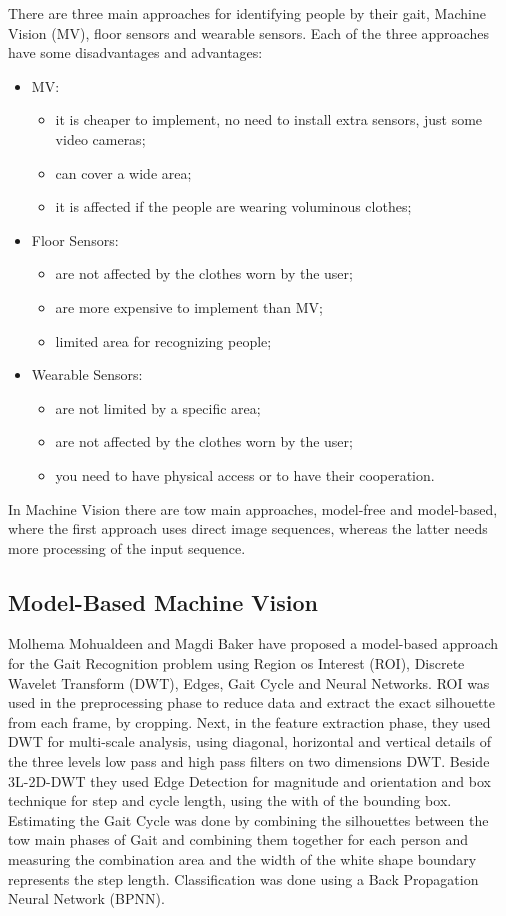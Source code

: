 \documentclass[12pt]{article}
\theoremstyle{definition}
\begin{document}
	There are three main approaches for identifying people by their gait, Machine Vision (MV), floor sensors and wearable sensors. Each of the three approaches have some disadvantages and advantages:
		\begin{itemize}
			\item MV:
				\begin{itemize}
					\item it is cheaper to implement, no need to install extra sensors, just some video cameras;
					\item can cover a wide area;
					\item it is affected if the people are wearing voluminous clothes;
				\end{itemize}
			\item Floor Sensors:
				\begin{itemize}
					\item are not affected by the clothes worn by the user;
					\item are more expensive to implement than MV;
					\item limited area for recognizing people;
				\end{itemize}
			\item Wearable Sensors:
				\begin{itemize}
					\item are not limited by a specific area;
					\item are not affected by the clothes worn by the user;
					\item you need to have physical access or to have their cooperation.
				\end{itemize}
		\end{itemize}

	In Machine Vision there are tow main approaches, model-free and model-based, where the first approach uses direct image sequences, whereas the latter needs more processing of the input sequence.

	\subsection{Model-Based Machine Vision}

	Molhema Mohualdeen and Magdi Baker \cite{gait-silhouette-nn} have proposed a model-based approach for the Gait Recognition problem using Region os Interest (ROI), Discrete Wavelet Transform (DWT), Edges, Gait Cycle and Neural Networks.
	ROI was used in the preprocessing phase to reduce data and extract the exact silhouette from each frame, by cropping. Next, in the feature extraction phase, they used DWT for multi-scale analysis, using diagonal, horizontal and vertical details of the three levels low pass and high pass filters on two dimensions DWT. Beside 3L-2D-DWT they used Edge Detection for magnitude and orientation and box technique for step and cycle length, using the with of the bounding box. Estimating the Gait Cycle was done by combining the silhouettes between the tow main phases of Gait and combining them together for each person and measuring the combination area and the width of the white shape boundary represents the step length. Classification was done using a Back Propagation Neural Network (BPNN).
\end{document}

